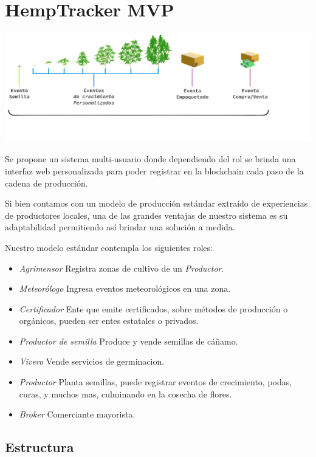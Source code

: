 \documentclass{article}
\begin{document}
\section{HempTracker MVP}

\includegraphics[width=\linewidth]{res/events.png}

Se propone un sistema multi-usuario donde dependiendo del rol se brinda una interfaz web personalizada para poder registrar en la blockchain cada paso de la cadena de producción.

Si bien contamos con un modelo de producción estándar extraído de experiencias de productores locales, una de las grandes ventajas de nuestro sistema es su adaptabilidad permitiendo así brindar una solución a medida.

Nuestro modelo estándar contempla los siguientes roles:

\begin{itemize}
	\item \textit{Agrimensor}
	\subitem Registra zonas de cultivo de un \textit{Productor}.
	\item \textit{Meteorólogo}
	\subitem Ingresa eventos meteorológicos en una zona.
	\item \textit{Certificador}
	\subitem Ente que emite certificados, sobre métodos de producción o orgánicos, pueden ser entes estatales o privados.
	\item \textit{Productor de semilla}
	\subitem Produce y vende semillas de cáñamo.
	\item \textit{Vivero}
	\subitem Vende servicios de germinacion.
	\item \textit{Productor}
	\subitem Planta semillas, puede registrar eventos de crecimiento, podas, curas, y muchos mas, culminando en la cosecha de flores.
	\item \textit{Broker}
	\subitem Comerciante mayorista.
\end{itemize}

\subsection{Estructura}
\end{document}
